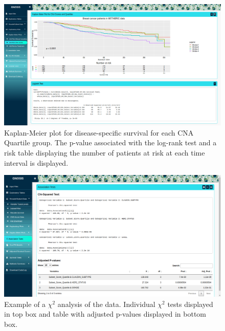 \vfill 

\begin{figure}[!h]
\center
\includegraphics[width=1\textwidth]{../figures/Chapter_3/GNOSIS_Fig5.png}
\caption[Kaplan-Meier plot for disease-specific survival for each CNA Quartile group.]{Kaplan-Meier plot for disease-specific survival for each CNA Quartile group. The p-value associated with the log-rank test and a risk table displaying the number of patients at risk at each time interval is displayed.}
\label{fig:GNOSIS_Tab5}
\end{figure}

\vfill 

\begin{figure}[!hp]
\center
\includegraphics[width=1\textwidth]{../figures/Chapter_3/GNOSIS_Fig6.png}
\caption[Example of a $\chi^2$ analysis of the data.]{Example of a $\chi^2$ analysis of the data. Individual $\chi^2$ tests displayed in top box and table with adjusted p-values displayed in bottom box.}
\label{fig:GNOSIS_Tab6}
\end{figure}

